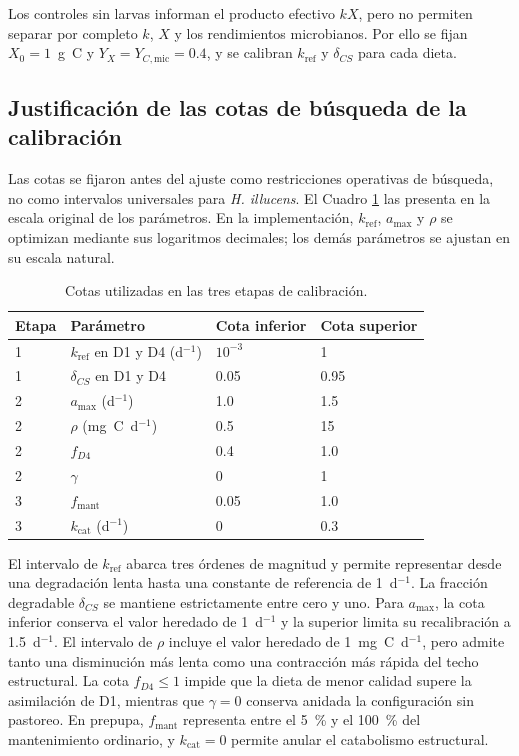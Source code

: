 Los controles sin larvas informan el producto efectivo $kX$, pero no permiten
separar por completo $k$, $X$ y los rendimientos microbianos. Por ello se
fijan $X_0=1$~g~C y $Y_X=Y_{C,\mathrm{mic}}=0.4$, y se calibran
$k_{\mathrm{ref}}$ y $\delta_{CS}$ para cada dieta.

\subsection{Justificación de las cotas de búsqueda de la calibración}
\label{sup:cotas}
Las cotas se fijaron antes del ajuste como restricciones operativas de búsqueda,
no como intervalos universales para \textit{H. illucens}. El Cuadro
\ref{tab:cotas-busqueda} las presenta en la escala original de los parámetros.
En la implementación, $k_{\mathrm{ref}}$, $a_{\max}$ y $\rho$ se optimizan
mediante sus logaritmos decimales; los demás parámetros se ajustan en su
escala natural.

\begin{table}[htbp]
  \centering
  \small
  \caption{Cotas utilizadas en las tres etapas de calibración.}
  \label{tab:cotas-busqueda}
  \begin{tabular}{llll}
    \toprule
    Etapa & Parámetro & Cota inferior & Cota superior \\
    \midrule
    1 & $k_{\mathrm{ref}}$ en D1 y D4 (d$^{-1}$) & $10^{-3}$ & 1 \\
    1 & $\delta_{CS}$ en D1 y D4 & 0.05 & 0.95 \\
    2 & $a_{\max}$ (d$^{-1}$) & 1.0 & 1.5 \\
    2 & $\rho$ (mg~C~d$^{-1}$) & 0.5 & 15 \\
    2 & $f_{D4}$ & 0.4 & 1.0 \\
    2 & $\gamma$ & 0 & 1 \\
    3 & $f_{\mathrm{mant}}$ & 0.05 & 1.0 \\
    3 & $k_{\mathrm{cat}}$ (d$^{-1}$) & 0 & 0.3 \\
    \bottomrule
  \end{tabular}
\end{table}

El intervalo de $k_{\mathrm{ref}}$ abarca tres órdenes de magnitud y permite
representar desde una degradación lenta hasta una constante de referencia de
1~d$^{-1}$. La fracción degradable $\delta_{CS}$ se mantiene estrictamente
entre cero y uno. Para $a_{\max}$, la cota inferior conserva el valor heredado
de 1~d$^{-1}$ y la superior limita su recalibración a 1.5~d$^{-1}$. El
intervalo de $\rho$ incluye el valor heredado de 1~mg~C~d$^{-1}$, pero admite
tanto una disminución más lenta como una contracción más rápida del techo
estructural. La cota $f_{D4}\leq 1$ impide que la dieta de menor calidad
supere la asimilación de D1, mientras que $\gamma=0$ conserva anidada la
configuración sin pastoreo. En prepupa, $f_{\mathrm{mant}}$ representa entre
el 5~\% y el 100~\% del mantenimiento ordinario, y $k_{\mathrm{cat}}=0$
permite anular el catabolismo estructural.

